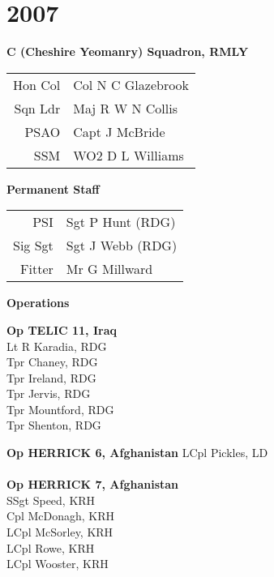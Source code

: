 \chapter*{2007}

\vspace*{10mm}

\begin{center}
  \Large
  \textbf{C (Cheshire Yeomanry) Squadron, RMLY}
\end{center}

\begin{center}
  \begin{tabular}{rl}
    Hon Col & Col N C Glazebrook \\
    Sqn Ldr & Maj R W N Collis \\
    PSAO & Capt J McBride \\
    SSM & WO2 D L Williams \\
  \end{tabular}
\end{center}

\vspace*{10mm}

\begin{center}
  \Large
  \textbf{Permanent Staff}
\end{center}

\begin{center}
  \begin{tabular}{rl}
    PSI & Sgt P Hunt (RDG) \\
    Sig Sgt & Sgt J Webb (RDG) \\
    Fitter & Mr G Millward \\
  \end{tabular}
\end{center}

\vspace*{10mm}

\begin{center}
  \Large
  \textbf{Operations}
\end{center}

\begin{multicols}{2}
  \noindent
  \textbf{Op TELIC 11, Iraq} \\
  Lt R Karadia, RDG \\
  Tpr Chaney, RDG \\
  Tpr Ireland, RDG \\
  Tpr Jervis, RDG \\
  Tpr Mountford, RDG \\
  Tpr Shenton, RDG

  \columnbreak
  
  \noindent
  \textbf{Op HERRICK 6, Afghanistan}
  LCpl Pickles, LD \\
  \\
  \textbf{Op HERRICK 7, Afghanistan} \\
  SSgt Speed, KRH \\
  Cpl McDonagh, KRH \\
  LCpl McSorley, KRH \\
  LCpl Rowe, KRH \\
  LCpl Wooster, KRH \\
\end{multicols}

